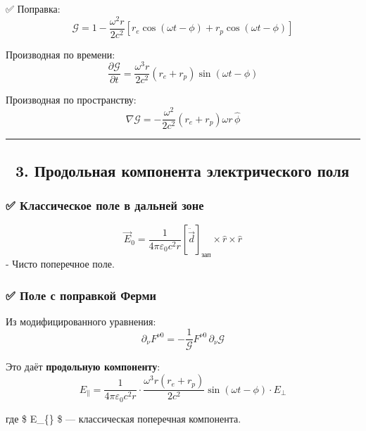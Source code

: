 \documentclass[11pt]{article}
\begin{document}
✅ Поправка: \[
\mathcal{G} = 1 - \frac{\omega^2 r}{2c^2} \left[ r_e \cos(\omega t - \phi) + r_p \cos(\omega t - \phi) \right]
\]

Производная по времени: \[
\frac{\partial \mathcal{G}}{\partial t} = \frac{\omega^3 r}{2c^2} \left( r_e + r_p \right) \sin(\omega t - \phi)
\]

Производная по пространству: \[
\nabla \mathcal{G} = -\frac{\omega^2}{2c^2} \left( r_e + r_p \right) \omega r \, \hat{\phi}
\]

\begin{center}\rule{0.5\linewidth}{\linethickness}\end{center}

\subsection{🔹 3. Продольная компонента электрического
поля}\label{ux43fux440ux43eux434ux43eux43bux44cux43dux430ux44f-ux43aux43eux43cux43fux43eux43dux435ux43dux442ux430-ux44dux43bux435ux43aux442ux440ux438ux447ux435ux441ux43aux43eux433ux43e-ux43fux43eux43bux44f}

\subsubsection{✅ Классическое поле в дальней
зоне}\label{ux43aux43bux430ux441ux441ux438ux447ux435ux441ux43aux43eux435-ux43fux43eux43bux435-ux432-ux434ux430ux43bux44cux43dux435ux439-ux437ux43eux43dux435}

\[
\vec{E}_0 = \frac{1}{4\pi\varepsilon_0 c^2 r} \left[ \ddot{\vec{d}} \right]_{\text{зап}} \times \hat{r} \times \hat{r}
\] - Чисто поперечное поле.

\subsubsection{✅ Поле с поправкой
Ферми}\label{ux43fux43eux43bux435-ux441-ux43fux43eux43fux440ux430ux432ux43aux43eux439-ux444ux435ux440ux43cux438}

Из модифицированного уравнения: \[
\partial_\nu F^{\nu 0} = -\frac{1}{\mathcal{G}} F^{\nu 0} \, \partial_\nu \mathcal{G}
\]

Это даёт \textbf{продольную компоненту}: \[
\boxed{
E_{\parallel} = \frac{1}{4\pi\varepsilon_0 c^2 r} \cdot \frac{\omega^3 r (r_e + r_p)}{2c^2} \sin(\omega t - \phi) \cdot E_{\perp}
}
\]

где \$ E\_\{\perp\} \$ --- классическая поперечная компонента.
\end{document}
